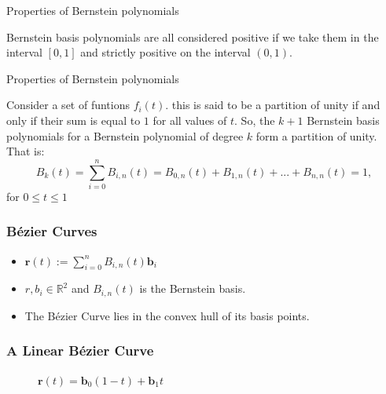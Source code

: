 \documentclass[mathserif,serif]{beamer}
\begin{document}
\begin{frame}{Properties of Bernstein polynomials}
\begin{theorem}[Positivity]
Bernstein basis polynomials are all considered positive if we take them in the interval $[0,1]$ and strictly positive on the interval $(0,1)$.
\end{theorem}    
\end{frame}
\begin{frame}{Properties of Bernstein polynomials}
\begin{theorem}
Consider a set of funtions $f_i(t)$. this is said to be a partition of unity if and only if their sum is equal to $1$ for all values of $t$. So, the $k + 1$ Bernstein basis polynomials for a Bernstein polynomial of degree $k$ form a partition of unity. That is:
\begin{equation*}
B_k(t)=\sum_{i=0}^nB_{i,n}(t)= B_{0,n}(t)+B_{1,n}(t)+...+B_{n,n}(t)=1,
\end{equation*}
for $0\leq t\leq 1$  
\end{theorem}    
\end{frame}

\begin{frame}
  \frametitle{B\'ezier Curves}
  \begin{itemize}
  \item<+-> $\mathbf{r}(t) := \sum_{i=0}^{n} B_{i,n}(t) \mathbf{b}_i$
  \item<+-> $r, b_i \in \mathbb{R}^2$ and $B_{i,n}(t)$ is the Bernstein basis.
  \item<+-> The B\'ezier Curve lies in the convex hull of its basis points.
\end{itemize}
 \end{frame}

\begin{frame}
  \frametitle{A Linear B\'ezier Curve}
  \begin{figure}
  \centering
  \caption{$\mathbf{r}(t) = \mathbf{b}_0 (1 - t) + \mathbf{b}_1 t$}
\end{figure}
\end{frame}
\end{document}
